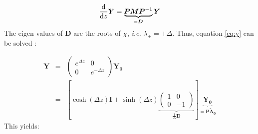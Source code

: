 \begin{equation}
	\dv{z}\bm{Y} = \underbrace{\bm{P}\bm{M}\bm{P}^{-1}}_{=\bm{D}}\bm{Y}\label{eq:y}
\end{equation}
The eigen values of $\bm{D}$ are the roots of $\chi$, \textit{i.e.} $\lambda_\pm = \pm \Delta$. Thus, equation \ref{eq:y} can be solved :

\begin{eqnarray}
	\bm{Y} &=& \begin{pmatrix}
	e^{\Delta z} & 0\\
	0 & e^{-\Delta z}
	\end{pmatrix} \bm{Y_0}\\
	&=& \left[\cosh(\Delta z)\bm{I} + \sinh(\Delta z)\underbrace{\begin{pmatrix}
	1 & 0\\
	0 & -1
	\end{pmatrix}}_{\frac{1}{\Delta}\bm{D}}\right]\underbrace{\bm{Y_0}}_{=\bm{P}\bm{\tilde{A}_0}}
\end{eqnarray}
This yields:


